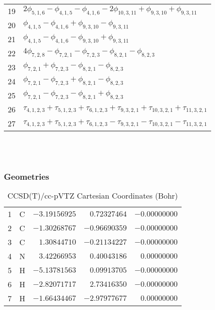 \documentclass[10pt,oneside]{article}
\begin{document}
\begin{table}[h!]
\begin{tabular}{ll}
  19  & $2\phi_{5,1,6} - \phi_{4,1,5} - \phi_{4,1,6} - 2\phi_{10,3,11} + \phi_{9,3,10} + \phi_{9,3,11}$ \\
  20  & $\phi_{4,1,5} - \phi_{4,1,6} + \phi_{9,3,10} - \phi_{9,3,11}$ \\
  21  & $\phi_{4,1,5} - \phi_{4,1,6} - \phi_{9,3,10} + \phi_{9,3,11}$ \\
  22  & $4\phi_{7,2,8} - \phi_{7,2,1} - \phi_{7,2,3} - \phi_{8,2,1} - \phi_{8,2,3}$ \\
  23  & $\phi_{7,2,1} + \phi_{7,2,3} - \phi_{8,2,1} - \phi_{8,2,3}$ \\
  24  & $\phi_{7,2,1} - \phi_{7,2,3} + \phi_{8,2,1} - \phi_{8,2,3}$ \\
  25  & $\phi_{7,2,1} - \phi_{7,2,3} - \phi_{8,2,1} + \phi_{8,2,3}$ \\
  26  & $\tau_{4,1,2,3} + \tau_{5,1,2,3} + \tau_{6,1,2,3} + \tau_{9,3,2,1} + \tau_{10,3,2,1} + \tau_{11,3,2,1}$ \\
  27  & $\tau_{4,1,2,3} + \tau_{5,1,2,3} + \tau_{6,1,2,3} - \tau_{9,3,2,1} - \tau_{10,3,2,1} - \tau_{11,3,2,1}$ \\
\end{tabular}
\end{table}

\clearpage

\subsection{\ \ \ }

\subsubsection*{Geometries}
\begin{table}[h!]
\centering
\caption{CCSD(T)/cc-pVTZ Cartesian Coordinates (Bohr)}
\begin{tabular}{llrrr}
1  & C  & $-3.19156925$ & $ 0.72327464$ & $-0.00000000$ \\
2  & C  & $-1.30268767$ & $-0.96690359$ & $-0.00000000$ \\
3  & C  & $ 1.30844710$ & $-0.21134227$ & $-0.00000000$ \\
4  & N  & $ 3.42266953$ & $ 0.40043186$ & $ 0.00000000$ \\
5  & H  & $-5.13781563$ & $ 0.09913705$ & $-0.00000000$ \\
6  & H  & $-2.82071717$ & $ 2.73416350$ & $-0.00000000$ \\
7  & H  & $-1.66434467$ & $-2.97977677$ & $ 0.00000000$ \\
\end{tabular}
\end{table}
\end{document}
